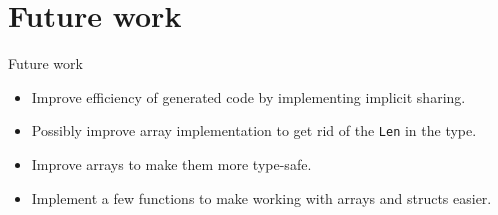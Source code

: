 \documentclass{beamer}
\begin{document}
\section{Future work}
\begin{frame}{Future work}
\begin{itemize}
  \item Improve efficiency of generated code by implementing implicit sharing.
  \item Possibly improve array implementation to get rid of the \texttt{Len} in
  the type.
  \item Improve arrays to make them more type-safe.
  \item Implement a few functions to make working with arrays and structs easier.
\end{itemize}
\end{frame}
\end{document}
